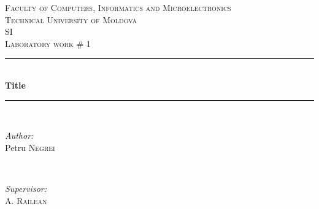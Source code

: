 \documentclass{article}
\begin{document}
  \begin{titlepage}

 \newcommand{\HRule}{\rule{\linewidth}{0.5mm}} %
  \begin{center} %

  \textsc{\Large Faculty of Computers, Informatics and Microelectronics}\\[0.5cm]
  \textsc{\LARGE Technical University of Moldova}\\[1.2cm] %
  \vspace{25 mm}
  \textsc{\Large SI}\\[0.5cm] %
  \textsc{\large Laboratory work \# 1}\\[0.5cm] %

  \vspace{10 mm}
  \HRule \\[0.4cm]
  { \LARGE \bfseries Title }\\[0.4cm] %
  \HRule \\[1.5cm]

  \vspace{40mm}

  \begin{minipage}{0.4\textwidth}
  \begin{flushleft} \large
  \emph{Author:}\\
  Petru \textsc{Negrei} %
  \end{flushleft}
  \end{minipage}
  ~
  \begin{minipage}{0.4\textwidth}
  \begin{flushright} \large
  \emph{Supervisor:} \\
  A. \textsc{Railean} %
  \end{flushright}
  \end{minipage}\\[4cm]


\end{center}
\end{titlepage}
\end{document}
